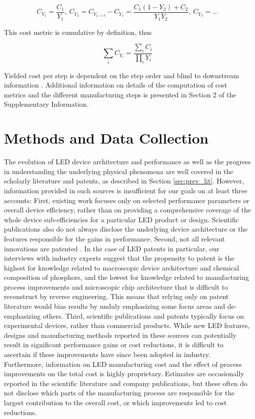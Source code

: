 \documentclass[twoside,twocolumn,9pt]{article}
\begin{document}
\begin{equation}
    C_{Y_1} = \frac{C_1}{Y_1}, \ C_{Y_2} = C_{Y_{2 \rightarrow 3}} - C_{Y_1} = \frac{C_1(1-Y_2)+C_2}{Y_1Y_2}, \ C_{Y_3}=\dots
\end{equation}

This cost metric is cumulative by definition, thus

\begin{equation}
    \sum_i C_{Y_i} = \frac{\sum_i C_i}{\prod_i Y_i}
\end{equation}

Yielded cost per step is dependent on the step order and blind to downstream information \cite{becker2001use}. Additional information on details of the computation of cost metrics and the different manufacturing steps is presented in Section 2 of the Supplementary Information.

\section{Methods and Data Collection}
\label{sec:methods}

The evolution of LED device architecture and performance as well as the progress in understanding the underlying physical phenomena are well covered in the scholarly literature and patents, as described in Section \ref{sec:prev_lit}. However, information provided in such sources is insufficient for our goals on at least three accounts: First, existing work focuses only on selected performance parameters or overall device efficiency, rather than on providing a comprehensive coverage of the whole device sub-efficiencies for a particular LED product or design. Scientific publications also do not always disclose the underlying device architecture or the features responsible for the gains in performance. Second, not all relevant innovations are patented \cite{Pakes_1980}\cite{ Fontana_2013}. In the case of LED patents in particular, our interviews with industry experts suggest that the propensity to patent is the highest for knowledge related to macroscopic device architecture and chemical composition of phosphors, and the lowest for knowledge related to manufacturing process improvements and microscopic chip architecture that is difficult to reconstruct by reverse engineering. This means that relying only on patent literature would bias results by unduly emphasizing some focus areas and de-emphasizing others. Third, scientific publications and patents typically focus on experimental devices, rather than commercial products. While new LED features, designs and manufacturing methods reported in these sources can potentially result in significant performance gains or cost reductions, it is difficult to ascertain if these improvements have since been adopted in industry.  Furthermore, information on LED manufacturing cost and the effect of process improvements on the total cost is highly proprietary. Estimates are occasionally reported in the scientific literature and company publications, but these often do not disclose which parts of the manufacturing process are responsible for the largest contribution to the overall cost, or which improvements led to cost reductions.
\end{document}
